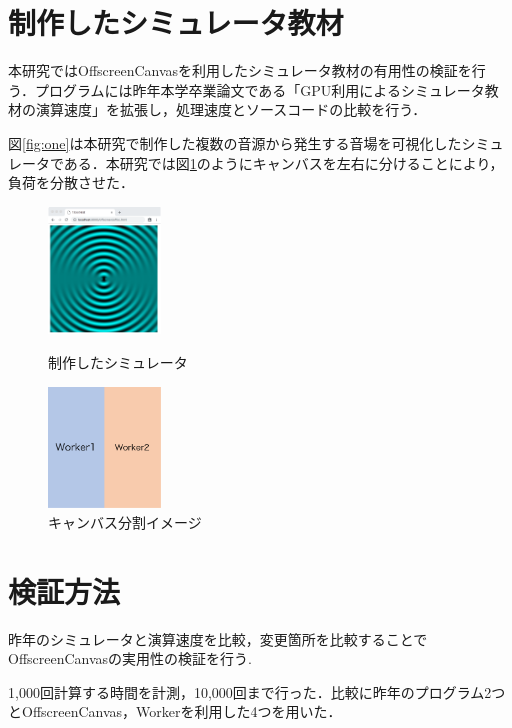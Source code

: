 \documentclass[twocolumn,10pt,a4j]{jsarticle}
\begin{document}
\section{制作したシミュレータ教材}
本研究ではOffscreenCanvasを利用したシミュレータ教材の有用性の検証を行う．プログラムには昨年本学卒業論文である「GPU利用によるシミュレータ教材の演算速度」を拡張し，処理速度とソースコードの比較を行う．

図\ref{fig:one}は本研究で制作した複数の音源から発生する音場を可視化したシミュレータである．本研究では図\ref{fig:two}のようにキャンバスを左右に分けることにより，負荷を分散させた．


\begin{figure}[htbp]
 \begin{minipage}{0.49\hsize}
  \begin{center}
   \includegraphics[width=30mm]{sim.pdf}
  \end{center}
  \caption{制作したシミュレータ}
  \label{fig:one}
 \end{minipage}
 \begin{minipage}{0.49\hsize}
  \begin{center}
  \includegraphics[width=30mm]{wake.pdf}
  \end{center}
  \caption{キャンバス分割イメージ}
  \label{fig:two}
 \end{minipage}
\end{figure}

\section{検証方法}
昨年のシミュレータと演算速度を比較，変更箇所を比較することでOffscreenCanvasの実用性の検証を行う.
 
1,000回計算する時間を計測，10,000回まで行った．比較に昨年のプログラム2つとOffscreenCanvas，Workerを利用した4つを用いた．
\end{document}

